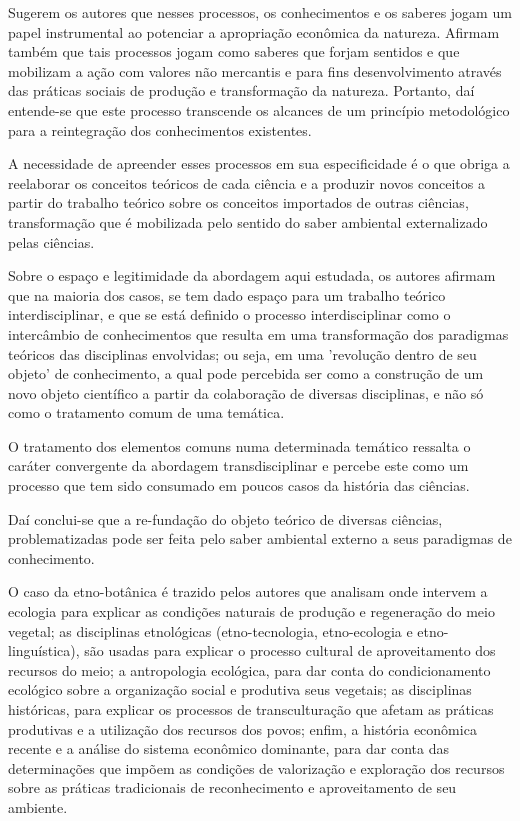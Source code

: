 \documentclass[
   article,       %
   12pt,          %
   oneside,       %
   a4paper,       %
   english,       %
   brazil,           %
   sumario=tradicional
   ]{abntex2}
\begin{document}
Sugerem os autores que nesses processos, os conhecimentos e os saberes jogam um papel instrumental ao potenciar a apropriação econômica da natureza. Afirmam também que tais processos jogam como saberes que forjam sentidos e que mobilizam a ação com valores não mercantis e para fins desenvolvimento através das práticas sociais de produção e transformação da natureza. Portanto, daí entende-se que este processo transcende os alcances de um princípio metodológico para a reintegração dos conhecimentos existentes. 

A necessidade de apreender esses processos em sua especificidade é o que obriga a reelaborar os conceitos teóricos de cada ciência e a produzir novos conceitos a partir do trabalho teórico sobre os conceitos importados de outras ciências, transformação que é mobilizada pelo sentido do saber ambiental externalizado pelas ciências.

Sobre o espaço e legitimidade da abordagem aqui estudada, os autores afirmam que na maioria dos casos, se tem dado espaço para um trabalho teórico interdisciplinar, e que se está definido o processo interdisciplinar como o intercâmbio de conhecimentos que resulta em uma transformação dos paradigmas teóricos das disciplinas envolvidas; ou seja, em uma 'revolução dentro de seu objeto' de conhecimento, a qual pode percebida ser como a construção de um novo objeto científico a partir da colaboração de diversas disciplinas, e não só como o tratamento comum de uma temática.

O tratamento dos elementos comuns numa determinada temático ressalta o caráter convergente da abordagem transdisciplinar e percebe este como um processo que tem sido consumado em poucos casos da história das ciências.

Daí conclui-se que a re-fundação do objeto teórico de diversas ciências, problematizadas pode ser feita pelo saber ambiental externo a seus paradigmas de conhecimento. 

O caso da etno-botânica é trazido pelos autores que analisam onde intervem a ecologia para explicar as condições naturais de produção e regeneração do meio vegetal; as disciplinas etnológicas (etno-tecnologia, etno-ecologia e etno-linguística), são usadas para explicar o processo cultural de aproveitamento dos recursos do meio; a antropologia ecológica, para dar conta do condicionamento ecológico sobre a organização social e produtiva seus vegetais; as disciplinas históricas, para explicar os processos de transculturação que afetam as práticas produtivas e a utilização dos recursos dos povos; enfim, a história econômica recente e a análise do sistema econômico dominante, para dar conta das determinações que impõem as condições de valorização e exploração dos recursos sobre as práticas tradicionais de reconhecimento e aproveitamento de seu ambiente.
\end{document}
